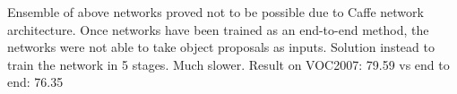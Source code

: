 Ensemble of above networks proved not to be possible due to Caffe network architecture. Once networks have been trained as an end-to-end method, the networks were not able to take object proposals as inputs. Solution instead to train the network in 5 stages. Much slower. Result on VOC2007: 79.59 vs end to end: 76.35 

